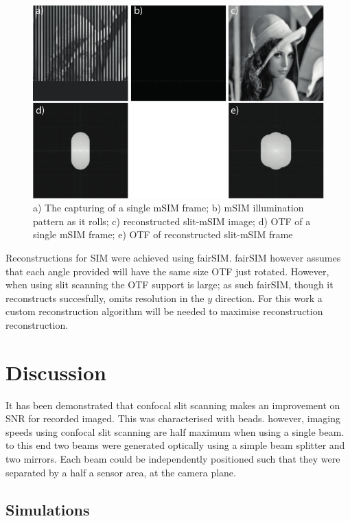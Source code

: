 \begin{figure}
  \centering
  \includegraphics{msim_slit}
  \caption{
  a) The capturing of a single mSIM frame;
  b) mSIM illumination pattern as it rolls;
  c) reconstructed slit-mSIM image;
  d) OTF of a single mSIM frame;
  e) OTF of reconstructed slit-mSIM frame
  }
  \label{}
\end{figure}


Reconstructions for SIM were achieved using fairSIM.
fairSIM however assumes that each angle provided will have the same size OTF just rotated.
However, when using slit scanning the OTF support is large; as such fairSIM, though it reconstructs succesfully, omits resolution in the $y$ direction.
For this work a custom reconstruction algorithm will be needed to maximise reconstruction reconstruction.

\section{Discussion}

It has been demonstrated that confocal slit scanning makes an improvement on SNR for recorded imaged.
This was characterised with beads.
however, imaging speeds using confocal slit scanning are half maximum when using a single beam.
to this end two beams were generated optically using a simple beam splitter and two mirrors.
Each beam could be independently positioned such that they were separated by a half a sensor area, at the camera plane.

\subsection{Simulations}

